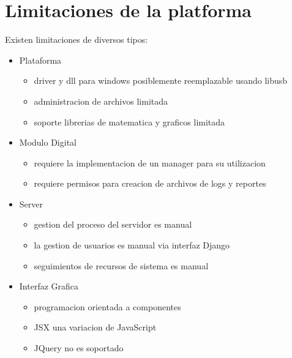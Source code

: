 \section{Limitaciones de la platforma}

Existen limitaciones de diversos tipos:

\begin{itemize}
    \item Plataforma
    \begin{itemize}
    \item driver y dll para windows posiblemente reemplazable usando libusb
    \item administracion de archivos limitada
    \item soporte librerias de matematica y graficos limitada
    \end{itemize}
    \item Modulo Digital
    \begin{itemize}
        \item requiere la implementacion de un manager para su utilizacion
        \item requiere permisos para creacion de archivos de logs y reportes
    \end{itemize}
    \item Server
    \begin{itemize}
        \item gestion del proceso del servidor es manual
        \item la gestion de usuarios es manual via interfaz Django
        \item seguimientos de recursos de sistema es manual
    \end{itemize}
    \item Interfaz Grafica
    \begin{itemize}
        \item programacion orientada a componentes
        \item JSX una variacion de JavaScript
        \item JQuery no es soportado
    \end{itemize}
\end{itemize}
\newpage
